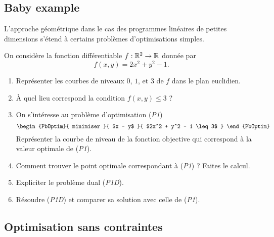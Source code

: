\documentclass[11pt, a4paper]{article}
\begin{document}
\subsection{Baby example}

L'approche géométrique dans le cas des programmes linéaires de petites
dimensions s'étend à certains problèmes d'optimisations simples.

\begin{question}{6}
On considère la fonction différentiable $f : \mathbb{R}^2 \to \mathbb{R}$ donnée par
\[
f(x, y) = 2x^2 + y^2 - 1.
\]
\begin{enumerate}
\item Représenter les courbes de niveaux $0$, $1$, et $3$ de $f$
  dans le plan euclidien.
\item À quel lieu correspond la condition $f(x, y) \leq 3$ ?
\item On s'intéresse au problème d'optimisation (\emph{P1})
  \[
  \begin{PbOptim}{
      minimiser
    }{
      $x - y$
    }{
      $2x^2 + y^2 - 1 \leq 3$
    }
  \end{PbOptim}
  \]
  Représenter la courbe de niveau de la fonction objective qui
  correspond à la valeur optimale de (\emph{P1}).
\item Comment trouver le point optimale correspondant à (\emph{P1}) ?
  Faites le calcul.
\item Expliciter le problème dual (\emph{P1D}).
\item Résoudre (\emph{P1D}) et comparer sa solution avec celle de
  (\emph{P1}).
\end{enumerate}
\end{question}

\subsection{Optimisation sans contraintes}
\end{document}
